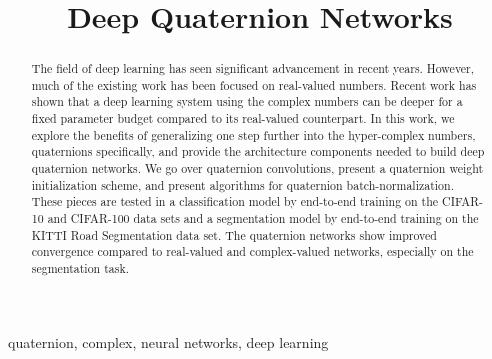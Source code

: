 \documentclass[conference]{IEEEtran}
\begin{document}
\title{Deep Quaternion Networks}

\author{
\and
{}
}

\maketitle

\begin{abstract}
The field of deep learning has seen significant advancement in recent years.
However, much of the existing work has been focused on real-valued numbers.
Recent work has shown that a deep learning system using the complex numbers can be deeper for a fixed parameter budget compared to its real-valued counterpart.
In this work, we explore the benefits of generalizing one step further into the hyper-complex numbers, quaternions specifically, and provide the architecture components needed to build deep quaternion networks.
We go over quaternion convolutions, present a quaternion weight initialization scheme, and present algorithms for quaternion batch-normalization.
These pieces are tested in a classification model by end-to-end training on the CIFAR-10 and CIFAR-100 data sets and a segmentation model by end-to-end training on the KITTI Road Segmentation data set. 
The quaternion networks show improved convergence compared to real-valued and complex-valued networks, especially on the segmentation task.
\end{abstract}

\begin{IEEEkeywords}
quaternion, complex, neural networks, deep learning
\end{IEEEkeywords}
\end{document}
